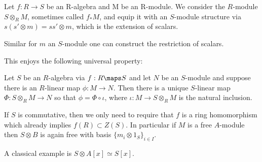Let \(f : R \to S\) be an R-algebra and M be an R-module. We consider the \(R\)-module
\( S \otimes_{R} M\), sometimes called \(f_{*}M\), and equip it with an \(S\)-module structure via
\(s (s' \otimes m) = ss' \otimes m\), which is the extension of scalars.

Similar for \(m\) an \(S\)-module one can construct the restriction of scalars.

This enjoys the following universal property:

Let \(S\) be an \(R\)-algebra via \(f : R \maps S\) and let \(N\) be an \(S\)-module and suppose there
is an \(R\)-linear map \(\phi : M \to N\). Then there is a unique \(S\)-linear map \(\Phi : S \otimes_{R} M \to N\) so that
\(\phi = \Phi \circ \iota\), where \(\iota : M \to S \otimes_{R} M\) is the natural inclusion.

If \(S\) is commutative, then we only need to require that \(f\) is a ring homomorphism which already implies \(f(R) \subset Z(S)\).
In particular if \(M\) is a free \(A\)-module then \(S \otimes B\) is again free with basis \(\{m_i \otimes 1_{S}\}_{i \in I}\).

A classical example is \(S \otimes A[x] \simeq S[x]\).
